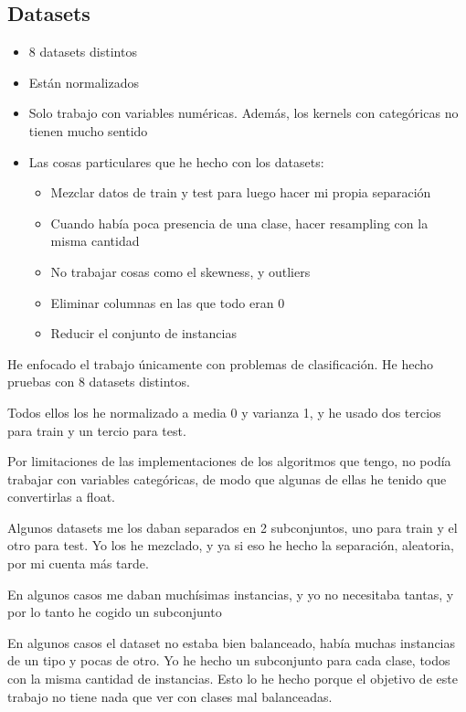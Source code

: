 \subsection{Datasets}

\begin{note}
  \begin{itemize}
    \item 8 datasets distintos
    \item Están normalizados
    \item Solo trabajo con variables numéricas. Además, los kernels con
    categóricas no tienen mucho sentido
    \item Las cosas particulares que he hecho con los datasets:
    \begin{itemize}
      \item Mezclar datos de train y test para luego hacer mi propia separación
      \item Cuando había poca presencia de una clase, hacer resampling con la
      misma cantidad
      \item No trabajar cosas como el skewness, y outliers
      \item Eliminar columnas en las que todo eran 0
      \item Reducir el conjunto de instancias
    \end{itemize}
  \end{itemize}
\end{note}

He enfocado el trabajo únicamente con problemas de clasificación. He hecho
pruebas con 8 datasets distintos.

Todos ellos los he normalizado a media 0 y varianza 1, y he usado dos tercios
para train y un tercio para test.

Por limitaciones de las implementaciones de los algoritmos que tengo, no podía
trabajar con variables categóricas, de modo que algunas de ellas he tenido que
convertirlas a float.

Algunos datasets me los daban separados en 2 subconjuntos, uno para train y el
otro para test. Yo los he mezclado, y ya si eso he hecho la separación,
aleatoria, por mi cuenta más tarde.

En algunos casos me daban muchísimas instancias, y yo no necesitaba tantas, y
por lo tanto he cogido un subconjunto

En algunos casos el dataset no estaba bien balanceado, había muchas instancias
de un tipo y pocas de otro. Yo he hecho un subconjunto para cada clase, todos
con la misma cantidad de instancias. Esto lo he hecho porque el objetivo de este
trabajo no tiene nada que ver con clases mal balanceadas.

